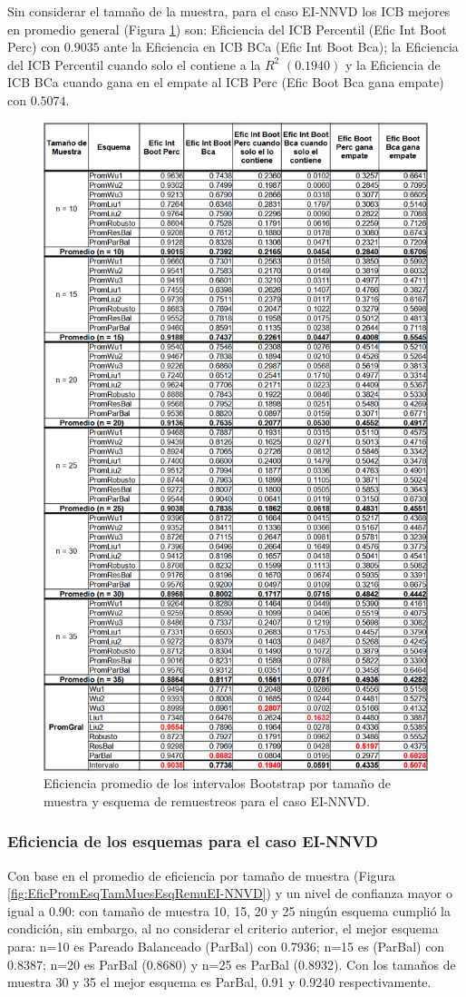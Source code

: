 Sin considerar el tamaño de la muestra, para el caso EI-NNVD los ICB mejores en promedio general (Figura \ref{fig:EficPromIntBootsTamMuestEsqRemuEI-NNVD}) son: Eficiencia del ICB Percentil (Efic Int Boot Perc) con $0.9035$ ante la Eficiencia en ICB BCa (Efic Int Boot Bca); la Eficiencia del ICB Percentil cuando solo el contiene a la $R^{2}$ $(0.1940)$ y la Eficiencia de ICB BCa cuando gana en el empate al ICB Perc (Efic Boot Bca gana empate) con $0.5074$.

\begin{figure}[ht] 
	\centering 
	\includegraphics[width=0.55\linewidth]{img/EI_NNVD_Efic_Boots.png} 
	\caption{Eficiencia promedio de los intervalos Bootstrap por tamaño de muestra y esquema de remuestreos para el caso EI-NNVD.} 
	\label{fig:EficPromIntBootsTamMuestEsqRemuEI-NNVD}
\end{figure}
\FloatBarrier

\subsubsection{Eficiencia de los esquemas para el caso EI-NNVD}
Con base en el promedio de eficiencia por tamaño de muestra (Figura \ref{fig:EficPromEsqTamMuesEsqRemuEI-NNVD}) y un nivel de confianza mayor o igual a 0.90: con tamaño de muestra 10, 15, 20 y 25 ningún esquema cumplió la condición, sin embargo, al no considerar el criterio anterior, el mejor esquema para: n=10 es Pareado Balanceado (ParBal) con 0.7936; n=15 es (ParBal) con 0.8387;  n=20 es ParBal (0.8680) y  n=25 es ParBal (0.8932). Con los tamaños de muestra 30 y 35 el mejor esquema es ParBal, 0.91 y 0.9240 respectivamente.
\vspace{.5cm}

